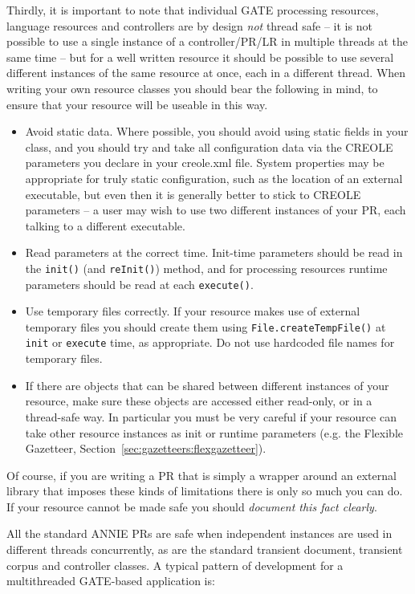 Thirdly, it is important to note that individual GATE processing
resources, language resources and controllers are by design {\it not} thread
safe -- it is not possible to use a single instance of a controller/PR/LR in
multiple threads at the same time -- but for a well written resource it should
be possible to use several different instances of the same resource at once,
each in a different thread.  When writing your own resource classes you should
bear the following in mind, to ensure that your resource will be useable in
this way.
%
\begin{itemize}
\item Avoid static data.  Where possible, you should avoid using static fields
in your class, and you should try and take all configuration data via the
CREOLE parameters you declare in your creole.xml file.  System properties may
be appropriate for truly static configuration, such as the location of an
external executable, but even then it is generally better to stick to CREOLE
parameters -- a user may wish to use two different instances of your PR, each
talking to a different executable.
\item Read parameters at the correct time.  Init-time parameters should be read
in the \texttt{init()} (and \texttt{reInit()}) method, and for processing
resources runtime parameters should be read at each \texttt{execute()}.
\item Use temporary files correctly.  If your resource makes use of external
temporary files you should create them using \texttt{File.createTempFile()} at
\texttt{init} or \texttt{execute} time, as appropriate.  Do not use hardcoded
file names for temporary files.
\item If there are objects that can be shared between different instances of
your resource, make sure these objects are accessed either read-only, or in a
thread-safe way.  In particular you must be very careful if your resource can
take other resource instances as init or runtime parameters (e.g. the Flexible
Gazetteer, Section~\ref{sec:gazetteers:flexgazetteer}).
\end{itemize}

Of course, if you are writing a PR that is simply a wrapper around an external
library that imposes these kinds of limitations there is only so much you can
do.  If your resource cannot be made safe you should {\em document this fact
clearly}.

All the standard ANNIE PRs are safe when independent instances are used in
different threads concurrently, as are the standard transient document,
transient corpus and controller classes.  A typical pattern of development for
a multithreaded GATE-based application is:

